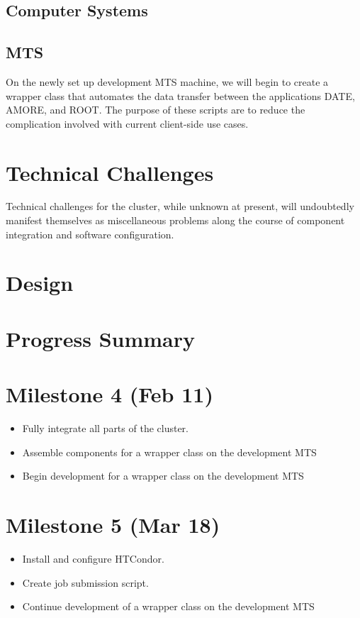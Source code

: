\documentclass[12pt]{article}
\begin{document}
\subsection{Computer Systems}
\subsection{MTS}
On the newly set up development MTS machine, we will begin to create a wrapper class that automates the data transfer between the applications DATE, AMORE, and ROOT. The purpose of these scripts are to reduce the complication involved with current client-side use cases.
\section{Technical Challenges}
Technical challenges for the cluster, while unknown at present, will
undoubtedly manifest themselves as miscellaneous problems along the course of
component integration and software configuration. 
\section{Design}

\section{Progress Summary}

\section{Milestone 4 (Feb 11)}
\begin{itemize}
  \item Fully integrate all parts of the cluster.
  \item Assemble components for a wrapper class on the development MTS
  \item Begin development for a wrapper class on the development MTS
\end{itemize}

\section{Milestone 5 (Mar 18)}
\begin{itemize}
  \item Install and configure HTCondor.
  \item Create job submission script.
  \item Continue development of a wrapper class on the development MTS
\end{itemize}
\end{document}
